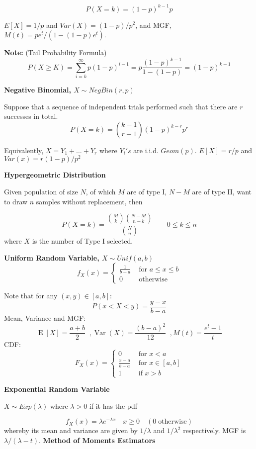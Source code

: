 \documentclass[a4paper]{article}
\newcommand{\subheading}[1]{{\scriptsize\textbf{#1}}}
\newcommand{\expectation}[1]{\operatorname{E}[#1]}
\DeclareMathOperator{\Var}{Var}
\begin{document}
\begin{multicols*}{4}
$$P(X=k) = (1-p)^{k-1}p$$

$E[X] = 1/p$ and $Var(X) = (1-p)/p^2$, and MGF, $M(t) = pe^t/(1 - (1-p)e^t)$. \smallskip

\textbf{Note: } (Tail Probability Formula)
$$
P(X\geq K) = \sum_{i=k}^{\infty}p(1-p)^{i-1} = p\frac{(1-p)^{k-1}}{1-(1-p)} = (1-p)^{k-1}
$$

\subheading{Negative Binomial, $X\sim NegBin(r,p)$}

Suppose that a sequence of independent trials performed such that there are $r$ successes in total.
$$
P(X=k) = \binom{k-1}{r-1} (1-p)^{k-r}p^r
$$

Equivalently, $X = Y_1 + \dots + Y_r$ where $Y_i's$ are i.i.d. $Geom(p)$.  $E[X] = r/p$ and $Var(x) = r(1-p)/p^2$
\smallskip

\subheading{Hypergeometric Distribution}

Given population of size $N$, of which $M$ are of type I, $N-M$ are of type II, want to draw $n$ samples without replacement, then

$$
P(X=k) = \frac{\binom{M}{k} \binom{N-M}{n-k}}{\binom{N}{n}} \quad \quad  0 \leq k \leq n
$$
where $X$ is the number of Type I selected. 
\smallskip

\subheading{Uniform Random Variable, $X \sim Unif(a,b)$}
$$f_X(x) = \begin{cases}
  \frac{1}{b-a} & \text{ for $a \leq x \leq b$} \\
  0   & \text{ otherwise}
\end{cases}$$

Note that for any $(x,y)\in [a,b]$:
$$
P(x < X < y) = \frac{y-x}{b-a}
$$
Mean, Variance and MGF:
$$
\expectation{X} = \frac{a+b}{2} \;\;, \Var(X) = \frac{(b-a)^2}{12} \;\;, M(t) = \frac{e^t-1}{t}
$$
CDF:
$$F_X(x) = \begin{cases}
  0   & \text{ for $x<a$} \\
  \frac{x-a}{b-a} & \text{ for $x \in [a,b]$} \\
  1   & \text{ if $x>b$}
\end{cases}$$


\subheading{Exponential Random Variable}

$X\sim Exp(\lambda)$ where $\lambda > 0$ if it has the pdf

$$
f_X(x) = \lambda e^{-\lambda x} \quad x \geq 0 \quad (0 \;  \text{otherwise})
$$
whereby its mean and variance are given by $1/\lambda$ and $1/\lambda^2$ respectively. MGF is $\lambda/(\lambda-t)$.
\smallskip
\hline
\smallskip
\subheading{Method of Moments Estimators}


\end{multicols*}
\end{document}
